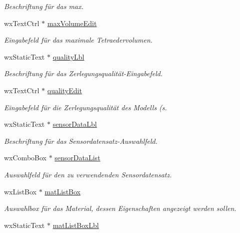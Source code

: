 \begin{DoxyCompactItemize}
\begin{DoxyCompactList}\small\item\em Beschriftung für das max. \end{DoxyCompactList}\item 
wx\-Text\-Ctrl $\ast$ \hyperlink{classPropertiesBox_ab738d2ef986a20be47a86bb676ae11db}{max\-Volume\-Edit}
\begin{DoxyCompactList}\small\item\em Eingabefeld für das maximale Tetraedervolumen. \end{DoxyCompactList}\item 
wx\-Static\-Text $\ast$ \hyperlink{classPropertiesBox_ad5339a1b07ae669a349478cf5c3b0fde}{quality\-Lbl}
\begin{DoxyCompactList}\small\item\em Beschriftung für das Zerlegungsqualität-\/\-Eingabefeld. \end{DoxyCompactList}\item 
wx\-Text\-Ctrl $\ast$ \hyperlink{classPropertiesBox_ab01869f0f594e103ea5698a480696b99}{quality\-Edit}
\begin{DoxyCompactList}\small\item\em Eingabefeld für die Zerlegungsqualität des Modells (s. \end{DoxyCompactList}\item 
wx\-Static\-Text $\ast$ \hyperlink{classPropertiesBox_ab9b6df8a3367b4b5b56ef82ab1bd7aa3}{sensor\-Data\-Lbl}
\begin{DoxyCompactList}\small\item\em Beschriftung für das Sensordatensatz-\/\-Auswahlfeld. \end{DoxyCompactList}\item 
wx\-Combo\-Box $\ast$ \hyperlink{classPropertiesBox_afc9329945c39f48e441c410b0ff3d9fa}{sensor\-Data\-List}
\begin{DoxyCompactList}\small\item\em Auswahlfeld für den zu verwendenden Sensordatensatz. \end{DoxyCompactList}\item 
wx\-List\-Box $\ast$ \hyperlink{classPropertiesBox_affd4774a26bd75a30c1d1c07d02edd18}{mat\-List\-Box}
\begin{DoxyCompactList}\small\item\em Auswahlbox für das Material, dessen Eigenschaften angezeigt werden sollen. \end{DoxyCompactList}\item 
wx\-Static\-Text $\ast$ \hyperlink{classPropertiesBox_aa08a220302b1d89a196dc7e03a390bd6}{mat\-List\-Box\-Lbl}

\end{DoxyCompactItemize}
